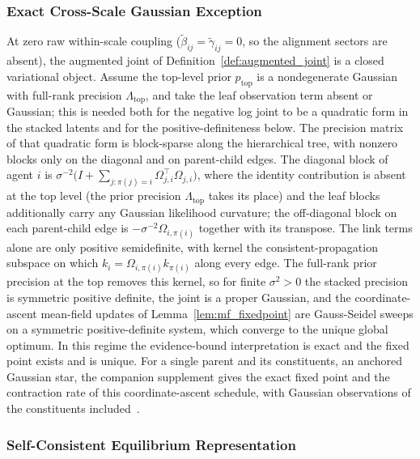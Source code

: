 \documentclass[11pt]{article}
\begin{document}
\subsubsection{Exact Cross-Scale Gaussian Exception}
\label{app:cross_scale_gaussian_exception}

At zero raw within-scale coupling ($\tilde\beta_{ij}=\tilde\gamma_{ij}=0$, so the alignment sectors are absent), the augmented joint of Definition~\ref{def:augmented_joint} is a closed variational object. Assume the top-level prior $p_{\mathrm{top}}$ is a nondegenerate Gaussian with full-rank precision $\Lambda_{\mathrm{top}}$, and take the leaf observation term absent or Gaussian; this is needed both for the negative log joint to be a quadratic form in the stacked latents and for the positive-definiteness below. The precision matrix of that quadratic form is block-sparse along the hierarchical tree, with nonzero blocks only on the diagonal and on parent-child edges. The diagonal block of agent $i$ is $\sigma^{-2}\big(I + \sum_{j : \pi(j) = i}\Omega_{j,i}^\top\Omega_{j,i}\big)$, where the identity contribution is absent at the top level (the prior precision $\Lambda_{\mathrm{top}}$ takes its place) and the leaf blocks additionally carry any Gaussian likelihood curvature; the off-diagonal block on each parent-child edge is $-\sigma^{-2}\Omega_{i,\pi(i)}$ together with its transpose. The link terms alone are only positive semidefinite, with kernel the consistent-propagation subspace on which $k_i = \Omega_{i,\pi(i)}k_{\pi(i)}$ along every edge. The full-rank prior precision at the top removes this kernel, so for finite $\sigma^2 > 0$ the stacked precision is symmetric positive definite, the joint is a proper Gaussian, and the coordinate-ascent mean-field updates of Lemma~\ref{lem:mf_fixedpoint} are Gauss-Seidel sweeps on a symmetric positive-definite system, which converge to the unique global optimum. In this regime the evidence-bound interpretation is exact and the fixed point exists and is unique. For a single parent and its constituents, an anchored Gaussian star, the companion supplement gives the exact fixed point and the contraction rate of this coordinate-ascent schedule, with Gaussian observations of the constituents included~\cite[Ch.~G10]{DennisGaugeVFESuppG2026}.

\subsubsection{Self-Consistent Equilibrium Representation}
\end{document}
